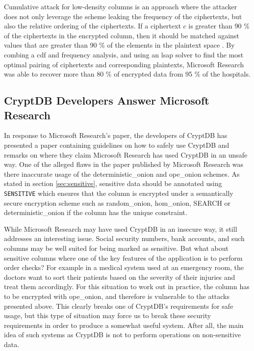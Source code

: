 Cumulative attack for low-density columns is an approach where the attacker does not only leverage the scheme leaking the frequency of the ciphertexts, but also the relative ordering of the ciphertexts. If a ciphertext $c$ is greater than 90 \% of the ciphertexts in the encrypted column, then it should be matched against values that are greater than 90 \% of the elements in the plaintext space \cite{microsoft_cryptdb}. By combing a \gls{cdf} and frequency analysis, and using an \gls{lsap} solver to find the most optimal pairing of ciphertexts and corresponding plaintexts, Microsoft Research was able to recover more than 80 \% of encrypted data from 95 \% of the hospitals.

\subsection{CryptDB Developers Answer Microsoft Research}

In response to Microsoft Research's paper, the developers of CryptDB has presented a paper containing guidelines \cite{cryptdb_guidelines} on how to safely use CryptDB and remarks on where they claim Microsoft Research has used CryptDB in an unsafe way. One of the alleged flaws in the paper published by Microsoft Research was there inaccurate usage of the \gls{deterministic_onion} and \gls{ope_onion} schemes. As stated in section \ref{sec:sensitive}, sensitive data should be annotated using \verb!SENSITIVE! which ensures that the column is encrypted under a semantically secure encryption scheme such as \gls{random_onion}, \gls{hom_onion}, SEARCH or \gls{deterministic_onion} if the column has the unique constraint. 

While Microsoft Research may have used CryptDB in an insecure way, it still addresses an interesting issue. Social security numbers, bank accounts, and such columns may be well suited for being marked as sensitive. But what about sensitive columns where one of the key features of the application is to perform order checks? For example in a medical system used at an emergency room, the doctors want to sort their patients based on the severity of their injuries and treat them accordingly. For this situation to work out in practice, the column has to be encrypted with \gls{ope_onion}, and therefore is vulnerable to the attacks presented above. This clearly breaks one of CryptDB's requirements for safe usage, but this type of situation may force us to break these security requirements in order to produce a somewhat useful system. After all, the main idea of such systems as CryptDB is not to perform operations on non-sensitive data.